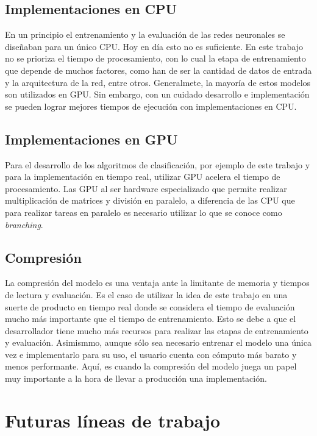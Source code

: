 \subsection*{Implementaciones en CPU}

\indent En un principio el entrenamiento y la evaluación de las redes neuronales se diseñaban para un único CPU. Hoy
en día esto no es suficiente. En este trabajo no se prioriza el tiempo de procesamiento, con lo cual la etapa de
entrenamiento que depende de muchos factores, como han de ser la cantidad de datos de entrada y la arquitectura de
la red, entre otros. Generalmete, la mayoría de estos modelos son utilizados en GPU. Sin embargo, con un cuidado
desarrollo e implementación se pueden lograr mejores tiempos de ejecución con implementaciones en CPU.

\subsection*{Implementaciones en GPU}

\indent Para el desarrollo de los algoritmos de clasificación, por ejemplo de este trabajo y para la implementación
en tiempo real, utilizar GPU acelera el tiempo de procesamiento. Las GPU al ser hardware especializado que permite
realizar multiplicación de matrices y división en paralelo, a diferencia de las CPU que para realizar tareas en
paralelo es necesario utilizar lo que se conoce como \textit{branching}.

\subsection*{Compresión}

\indent La compresión del modelo es una ventaja ante la limitante de memoria y tiempos de lectura y evaluación. Es
el caso de utilizar la idea de este trabajo en una suerte de producto en tiempo real donde se considera el tiempo de
evaluación mucho más importante que el tiempo de entrenamiento. Esto se debe a que el desarrollador tiene mucho más
recursos para realizar las etapas de entrenamiento y evaluación. Asimismmo, aunque sólo sea necesario entrenar el
modelo una única vez e implementarlo para su uso, el usuario cuenta con cómputo más barato y menos performante.
Aquí, es cuando la compresión del modelo juega un papel muy importante a la hora de llevar a producción una
implementación.

\section{Futuras líneas de trabajo}

